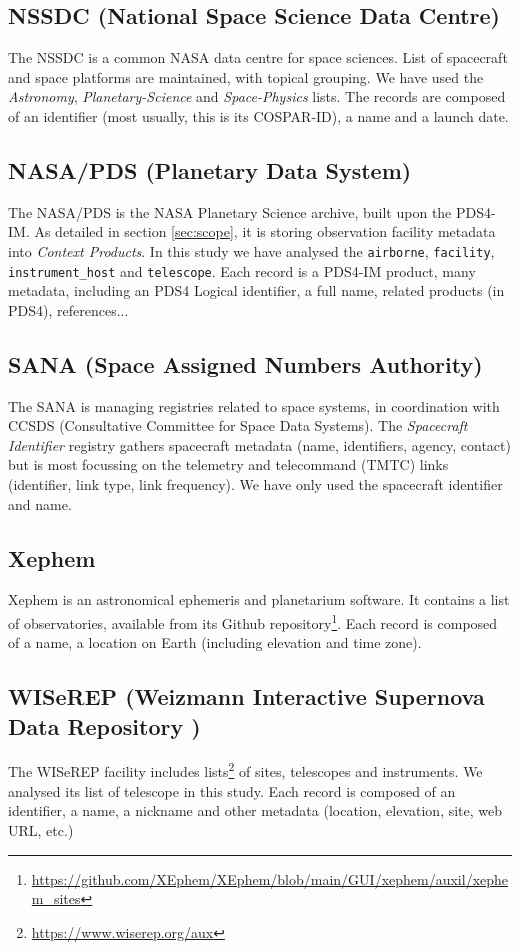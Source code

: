 \documentclass[11pt,a4paper]{ivoa}
\begin{document}
\subsection{NSSDC (National Space Science Data Centre)}
The NSSDC is a common NASA data centre for space sciences. List of 
spacecraft and space platforms are maintained, with topical grouping.
We have used the \emph{Astronomy}, \emph{Planetary-Science} and 
\emph{Space-Physics} lists. The records are composed of an 
identifier (most usually, this is its COSPAR-ID), a name and a
launch date.

\subsection{NASA/PDS (Planetary Data System)}
The NASA/PDS is the NASA Planetary Science archive, built upon the 
PDS4-IM. As detailed in section \ref{sec:scope}, it is storing 
observation facility metadata into \emph{Context Products}. In this 
study we have analysed the \texttt{airborne}, \texttt{facility},  
\texttt{instrument\_host} and \texttt{telescope}. Each record is 
a PDS4-IM product, many metadata, including an PDS4 Logical 
identifier, a full name, related products (in PDS4), references...

\subsection{SANA (Space Assigned Numbers Authority)}
The SANA is managing registries related to space systems, in 
coordination with CCSDS (Consultative Committee for Space Data
Systems). The \emph{Spacecraft Identifier} registry gathers 
spacecraft metadata (name, identifiers, agency, contact) but is 
most focussing on the telemetry and telecommand (TMTC) links 
(identifier, link type, link frequency). We have only used the 
spacecraft identifier and name.  

\subsection{Xephem}
Xephem is an astronomical ephemeris and planetarium software. It
contains a list of observatories, available from its Github 
repository\footnote{\url{https://github.com/XEphem/XEphem/blob/main/GUI/xephem/auxil/xephem_sites}}.
Each record is composed of a name, a location on Earth 
(including elevation and time zone).
  
\subsection{WISeREP (Weizmann Interactive Supernova Data Repository )}
The WISeREP facility includes lists\footnote{\url{https://www.wiserep.org/aux}} 
of sites, telescopes and instruments. We analysed its list of telescope 
in this study. Each record is composed of an identifier, a name, a 
nickname and other metadata (location, elevation, site, web URL, etc.)
\end{document}
